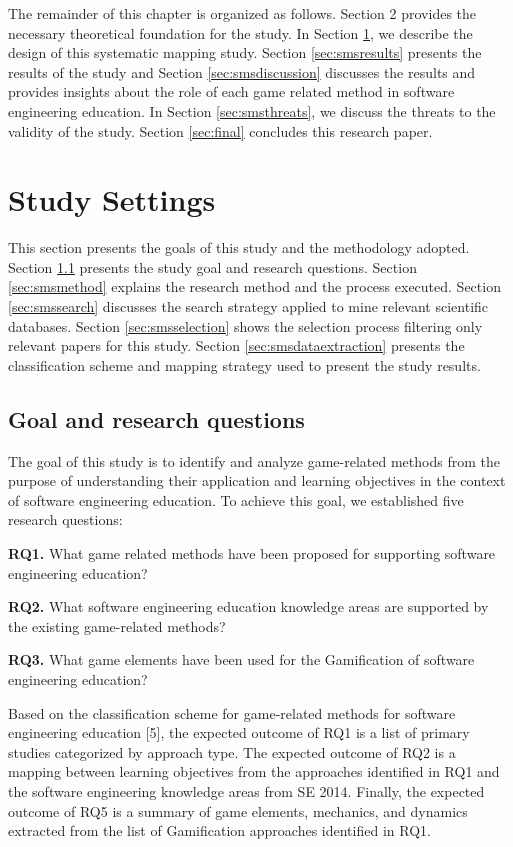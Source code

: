 The remainder of this chapter is organized as follows. Section 2 provides the necessary theoretical foundation for the study. In Section \ref{sec:smsstudySettings}, we describe the design of this systematic mapping study. Section \ref{sec:smsresults} presents the results of the study and Section \ref{sec:smsdiscussion} discusses the results and provides insights about the role of each game related method in software engineering education. In Section \ref{sec:smsthreats}, we discuss the threats to the validity of the study. Section \ref{sec:final} concludes this research paper.

\section{Study Settings}
\label{sec:smsstudySettings}

This section presents the goals of this study and the methodology adopted. Section \ref{sec:smsgoals} presents the study goal and research questions. Section \ref{sec:smsmethod} explains the research method and the process executed. Section \ref{sec:smssearch} discusses the search strategy applied to mine relevant scientific databases. Section \ref{sec:smsselection} shows the selection process filtering only relevant papers for this study. Section \ref{sec:smsdataextraction} presents the classification scheme and mapping strategy used to present the study results.

\subsection{Goal and research questions}
\label{sec:smsgoals}

The goal of this study is to identify and analyze game-related methods from the purpose of understanding their application and learning objectives in the context of software engineering education. To achieve this goal, we established five research questions:

\textbf{RQ1.} What game related methods have been proposed for supporting software engineering education?

\textbf{RQ2.} What software engineering education knowledge areas are supported by the existing game-related methods?

\textbf{RQ3.} What game elements have been used for the Gamification of software engineering education? 

Based on the classification scheme for game-related methods for software engineering education [5], the expected outcome of RQ1 is a list of primary studies categorized by approach type. The expected outcome of RQ2 is a mapping between learning objectives from the approaches identified in RQ1 and the software engineering knowledge areas from SE 2014. Finally, the expected outcome of RQ5 is a summary of game elements, mechanics, and dynamics extracted from the list of Gamification approaches identified in RQ1.


